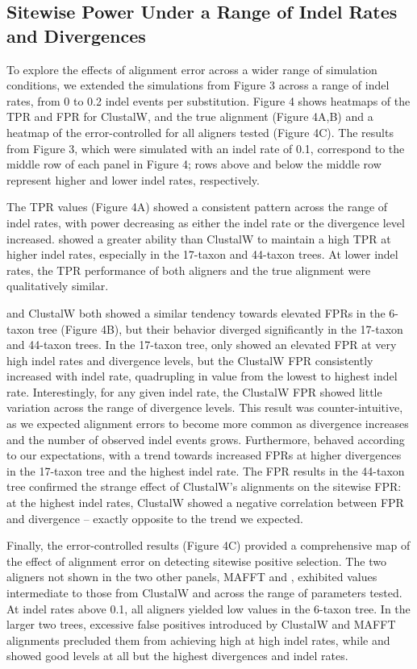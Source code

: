 \documentclass{mbe}
\begin{document}
\subsection*{Sitewise Power Under a Range of Indel Rates and Divergences}

To explore the effects of alignment error across a wider range of
simulation conditions, we extended the simulations from Figure 3
across a range of indel rates, from 0 to 0.2 indel events per
substitution. Figure 4 shows heatmaps of the TPR and FPR for ClustalW,
\prankc{} and the true alignment (Figure 4A,B) and a heatmap of the
error-controlled \tpr{} for all aligners tested (Figure 4C). The
results from Figure 3, which were simulated with an indel rate of 0.1,
correspond to the middle row of each panel in Figure 4; rows above and
below the middle row represent higher and lower indel rates,
respectively.

The TPR values (Figure 4A) showed a consistent pattern across the
range of indel rates, with power decreasing as either the indel rate
or the divergence level increased. \prankc{} showed a greater ability
than ClustalW to maintain a high TPR at higher indel rates, especially
in the 17-taxon and 44-taxon trees. At lower indel rates, the TPR
performance of both aligners and the true alignment were qualitatively
similar.

\prankc{} and ClustalW both showed a similar tendency towards elevated
FPRs in the 6-taxon tree (Figure 4B), but their behavior diverged
significantly in the 17-taxon and 44-taxon trees. In the 17-taxon
tree, \prankc{} only showed an elevated FPR at very high indel rates
and divergence levels, but the ClustalW FPR consistently increased
with indel rate, quadrupling in value from the lowest to highest indel
rate. Interestingly, for any given indel rate, the ClustalW FPR showed
little variation across the range of divergence levels. This result
was counter-intuitive, as we expected alignment errors to become more
common as divergence increases and the number of observed indel events
grows. Furthermore, \prankc{} behaved according to our expectations,
with a trend towards increased FPRs at higher divergences in the
17-taxon tree and the highest indel rate. The FPR results in the
44-taxon tree confirmed the strange effect of ClustalW’s alignments on
the sitewise FPR: at the highest indel rates, ClustalW showed a
negative correlation between FPR and divergence -- exactly opposite to
the trend we expected.

Finally, the error-controlled \tpr{} results (Figure 4C) provided a
comprehensive map of the effect of alignment error on detecting
sitewise positive selection. The two aligners not shown in the two
other panels, MAFFT and \pranka{}, exhibited \tpr{} values
intermediate to those from ClustalW and \prankc{} across the range of
parameters tested. At indel rates above 0.1, all aligners yielded low
\tpr{} values in the 6-taxon tree. In the larger two trees, excessive
false positives introduced by ClustalW and MAFFT alignments precluded
them from achieving high \tpr{} at high indel rates, while \pranka{}
and \prankc{} showed good \tpr{} levels at all but the highest
divergences and indel rates.
\end{document}
